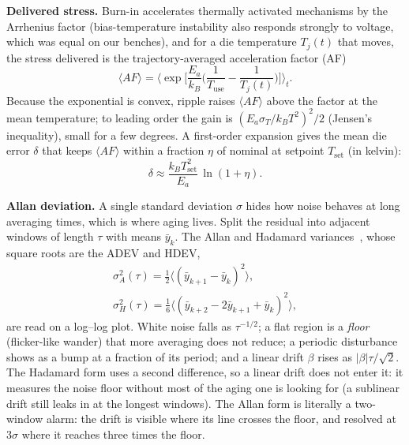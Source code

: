 \documentclass[10pt,twocolumn]{article}
\begin{document}
\textbf{Delivered stress.} Burn-in accelerates thermally activated mechanisms by the Arrhenius factor (bias-temperature instability also responds strongly to voltage, which was equal on our benches), and for a die temperature $T_j(t)$ that moves, the stress delivered is the trajectory-averaged acceleration factor (AF)
\begin{equation}
\langle AF\rangle=\Big\langle \exp\!\Big[\frac{E_a}{k_B}\Big(\frac{1}{T_{\mathrm{use}}}-\frac{1}{T_j(t)}\Big)\Big]\Big\rangle_t .
\label{eq:af}
\end{equation}
Because the exponential is convex, ripple raises $\langle AF\rangle$ above the factor at the mean temperature; to leading order the gain is $(E_a\sigma_T/k_BT^2)^2/2$ (Jensen's inequality), small for a few degrees. A first-order expansion gives the mean die error $\delta$ that keeps $\langle AF\rangle$ within a fraction $\eta$ of nominal at setpoint $T_{\mathrm{set}}$ (in kelvin):
\begin{equation}
\delta\approx\frac{k_B T_{\mathrm{set}}^2}{E_a}\,\ln(1+\eta).
\label{eq:delta}
\end{equation}

\textbf{Allan deviation.} A single standard deviation $\sigma$ hides how noise behaves at long averaging times, which is where aging lives. Split the residual into adjacent windows of length $\tau$ with means $\bar y_k$. The Allan and Hadamard variances~\cite{allan}, whose square roots are the ADEV and HDEV,
\begin{gather}
\sigma_A^2(\tau)=\frac{1}{2}\big\langle(\bar y_{k+1}-\bar y_k)^2\big\rangle,\nonumber\\
\sigma_H^2(\tau)=\frac{1}{6}\big\langle(\bar y_{k+2}-2\bar y_{k+1}+\bar y_k)^2\big\rangle,
\label{eq:allan}
\end{gather}
are read on a log--log plot. White noise falls as $\tau^{-1/2}$; a flat region is a \emph{floor} (flicker-like wander) that more averaging does not reduce; a periodic disturbance shows as a bump at a fraction of its period; and a linear drift $\beta$ rises as $|\beta|\tau/\sqrt2$. The Hadamard form uses a second difference, so a linear drift does not enter it: it measures the noise floor without most of the aging one is looking for (a sublinear drift still leaks in at the longest windows). The Allan form is literally a two-window alarm: the drift is visible where its line crosses the floor, and resolved at 3$\sigma$ where it reaches three times the floor.
\end{document}
